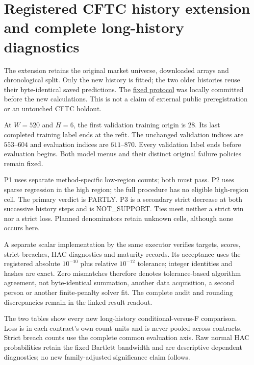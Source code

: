 \section{Registered CFTC history extension and complete long-history diagnostics}\label{sup:final-cftc}

The extension retains the original market universe, downloaded arrays and chronological split. Only the new history is fitted; the two older histories reuse their byte-identical saved predictions. The \href{https://github.com/ByronLi0207/financial-mathematics-paper-20261020/blob/final-jof/protocol/final-merge/wp2-cftc-mechanism.md}{fixed protocol} was locally committed before the new calculations. This is not a claim of external public preregistration or an untouched CFTC holdout.

At $W=520$ and $H=6$, the first validation training origin is $28$. Its last completed training label ends at the refit. The unchanged validation indices are $553$--$604$ and evaluation indices are $611$--$870$. Every validation label ends before evaluation begins. Both model menus and their distinct original failure policies remain fixed.

P1 uses separate method-specific low-region counts; both must pass. P2 uses sparse regression in the high region; the full procedure has no eligible high-region cell. The primary verdict is PARTLY. P3 is a secondary strict decrease at both successive history steps and is NOT\_SUPPORT. Ties meet neither a strict win nor a strict loss. Planned denominators retain unknown cells, although none occurs here.

A separate scalar implementation by the same executor verifies targets, scores, strict breaches, HAC diagnostics and maturity records. Its acceptance uses the registered absolute $10^{-10}$ plus relative $10^{-12}$ tolerance; integer identities and hashes are exact. Zero mismatches therefore denotes tolerance-based algorithm agreement, not byte-identical summation, another data acquisition, a second person or another finite-penalty solver fit. The complete audit and rounding discrepancies remain in the linked result readout.

The two tables show every new long-history conditional-versus-F comparison. Loss is in each contract's own count units and is never pooled across contracts. Strict breach counts use the complete common evaluation axis. Raw normal HAC probabilities retain the fixed Bartlett bandwidth and are descriptive dependent diagnostics; no new family-adjusted significance claim follows.

